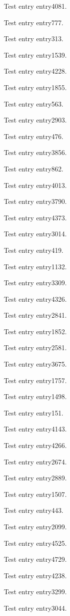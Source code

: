 Test entry \gls{entry4081}.

Test entry \gls{entry777}.

Test entry \gls{entry313}.

Test entry \gls{entry1539}.

Test entry \gls{entry4228}.

Test entry \gls{entry1855}.

Test entry \gls{entry563}.

Test entry \gls{entry2903}.

Test entry \gls{entry476}.

Test entry \gls{entry3856}.

Test entry \gls{entry862}.

Test entry \gls{entry4013}.

Test entry \gls{entry3790}.

Test entry \gls{entry4373}.

Test entry \gls{entry3014}.

Test entry \gls{entry419}.

Test entry \gls{entry1132}.

Test entry \gls{entry3309}.

Test entry \gls{entry4326}.

Test entry \gls{entry2841}.

Test entry \gls{entry1852}.

Test entry \gls{entry2581}.

Test entry \gls{entry3675}.

Test entry \gls{entry1757}.

Test entry \gls{entry1498}.

Test entry \gls{entry151}.

Test entry \gls{entry4143}.

Test entry \gls{entry4266}.

Test entry \gls{entry2674}.

Test entry \gls{entry2889}.

Test entry \gls{entry1507}.

Test entry \gls{entry443}.

Test entry \gls{entry2099}.

Test entry \gls{entry4525}.

Test entry \gls{entry4729}.

Test entry \gls{entry4238}.

Test entry \gls{entry3299}.

Test entry \gls{entry3044}.

